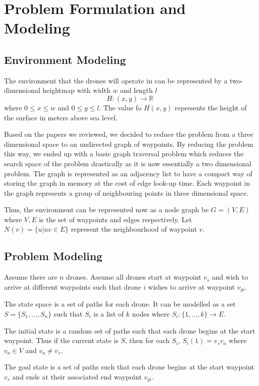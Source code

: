\documentclass[conference]{IEEEtran}
\begin{document}
\section{Problem Formulation and Modeling}

\subsection{Environment Modeling}
The environment that the drones will operate in can be represented by a two-dimensional heightmap with width $w$ and length $l$
$$H : (x, y) \rightarrow \mathbb{R}$$
where $0 \leq x \leq w$ and $0 \leq y \leq l$. The value fo $H(x, y)$ represents the height of the surface in meters above sea level.

Based on the papers we reviewed, we decided to reduce the problem from a three dimensional space to an undirected graph of waypoints. By reducing the problem this way, we ended up with a basic graph traversal problem which reduces the search space of the problem drastically as it is now essentially a two dimensional problem. The graph is represented as an adjacency list to have a compact way of storing the graph in memory at the cost of edge look-up time. Each waypoint in the graph represents a group of neighbouring points in three dimensional space.

Thus, the environment can be represented now as a node graph be $G = (V, E)$ where $V, E$ is the set of waypoints and edges respectively. Let $N(v) = \{ u | uv \in E \}$ represent the neighbourhood of waypoint $v$.

\subsection{Problem Modeling}
Assume there are $n$ drones. Assume all drones start at waypoint $v_s$ and wish to arrive at different waypoints such that drone $i$ wishes to arrive at waypoint $v_{gi}$.

The state space is a set of paths for each drone. It can be modelled as a set $S = \{S_1, ..., S_n\}$ such that $S_i$ is a list of $k$ nodes where $S_i : \{1, ..., k\} \rightarrow E$.

The initial state is a random set of paths such that each drone begins at the start waypoint. Thus if the current state is $S$, then for each $S_i$, $S_i(1) = v_sv_a$ where $v_a \in V$ and $v_a\neq v_s$.

The goal state is a set of paths such that each drone begins at the start waypoint $v_s$ and ends at their associated end waypoint $v_{gi}$.
\end{document}
